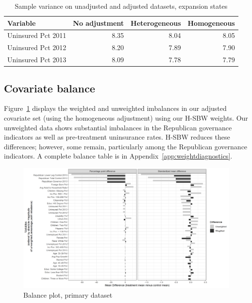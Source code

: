 \documentclass[aoas]{imsart}
\theoremstyle{plain}
\theoremstyle{remark}
\begin{document}
\begin{table}[ht]
\caption{Sample variance on unadjusted and adjusted datasets, expansion states}\label{tab:adjust1}
\begin{tabular}{lrrr}
  \hline
Variable & No adjustment & Heterogeneous & Homogeneous \\ 
  \hline
Uninsured Pct 2011 & 8.35 & 8.04 & 8.05 \\ 
  Uninsured Pct 2012 & 8.20 & 7.89 & 7.90 \\ 
  Uninsured Pct 2013 & 8.09 & 7.78 & 7.79 \\ 
   \hline
\end{tabular}
\end{table}

\subsection{Covariate balance}

Figure~\ref{fig:loveplotc1} displays the weighted and unweighted imbalances in our adjusted covariate set (using the homogeneous adjustment) using our H-SBW weights. Our unweighted data shows substantial imbalances in the Republican governance indicators as well as pre-treatment uninsurance rates. H-SBW reduces these differences; however, some remain, particularly among the Republican governance indicators. A complete balance table is in Appendix~\ref{app:weightdiagnostics}. 

\begin{figure}[H]
\begin{center}
    \caption{Balance plot, primary dataset}\label{fig:loveplotc1}
    \includegraphics[scale=0.45]{01_Plots/balance-plot-all-etuc1.png}
\end{center}
\end{figure}
\end{document}
